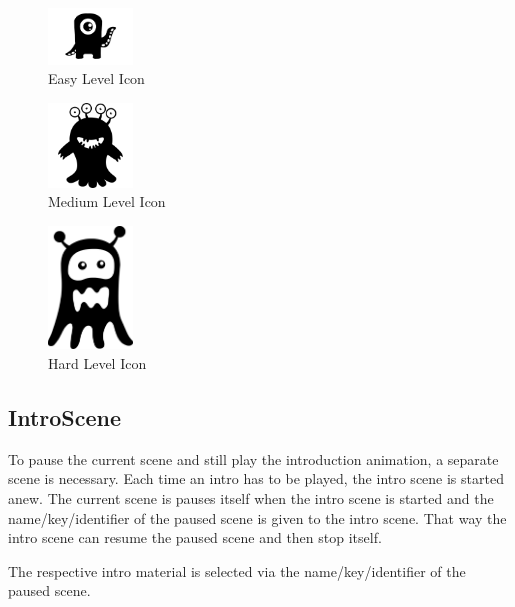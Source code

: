 \begin{figure}[H]
    \centering
    \includegraphics[width=0.2\textwidth]{figures/easylevelicon}
    \caption{Easy Level Icon}
    \label{fig:easylevelicon}
\end{figure}

\begin{figure}[H]
    \centering
    \includegraphics[width=0.2\textwidth]{figures/mediumlevelicon}
    \caption{Medium Level Icon}
    \label{fig:mediumlevelicon}
\end{figure}

\begin{figure}[H]
    \centering
    \includegraphics[width=0.2\textwidth]{figures/hardlevelicon}
    \caption{Hard Level Icon}
    \label{fig:hardlevelicon}
\end{figure}

\subsection{IntroScene}\label{subsec:introscene}
To pause the current scene and still play the introduction animation, a separate scene is necessary.
Each time an intro has to be played, the intro scene is started anew.
The current scene is pauses itself when the intro scene is started and the name/key/identifier
of the paused scene is given to the intro scene.
That way the intro scene can resume the paused scene and then stop itself.

The respective intro material is selected via the name/key/identifier of the paused scene.

